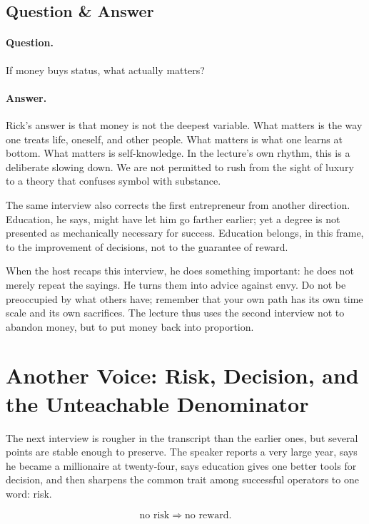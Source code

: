 \subsection{Question \& Answer}

\paragraph{Question.}
If money buys status, what actually matters?

\paragraph{Answer.}
Rick's answer is that money is not the deepest variable. What matters is the way one treats life, oneself, and other people. What matters is what one learns at bottom. What matters is self-knowledge. In the lecture's own rhythm, this is a deliberate slowing down. We are not permitted to rush from the sight of luxury to a theory that confuses symbol with substance.

The same interview also corrects the first entrepreneur from another direction. Education, he says, might have let him go farther earlier; yet a degree is not presented as mechanically necessary for success. Education belongs, in this frame, to the improvement of decisions, not to the guarantee of reward.

When the host recaps this interview, he does something important: he does not merely repeat the sayings. He turns them into advice against envy. Do not be preoccupied by what others have; remember that your own path has its own time scale and its own sacrifices. The lecture thus uses the second interview not to abandon money, but to put money back into proportion.

\section{Another Voice: Risk, Decision, and the Unteachable Denominator}

The next interview is rougher in the transcript than the earlier ones, but several points are stable enough to preserve. The speaker reports a very large year, says he became a millionaire at twenty-four, says education gives one better tools for decision, and then sharpens the common trait among successful operators to one word: risk.

\begin{equation}
\text{no risk} \Rightarrow \text{no reward}.
\end{equation}

